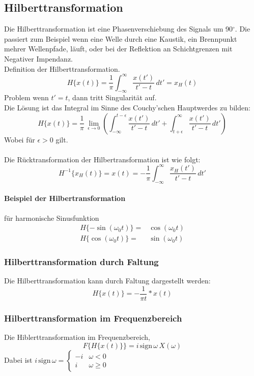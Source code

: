 \subsection{Hilberttransformation}
Die Hilberttransformation ist eine Phasenverschiebung des Signals um 90$^\circ$. Die passiert zum Beispiel wenn eine Welle durch eine Kaustik, ein Brennpunkt mehrer Wellenpfade, läuft, oder bei der Reflektion an Schichtgrenzen mit Negativer Impendanz.\\
Definition der Hilberttransformation.
\begin{equation}
H\{x(t)\} = \frac{1}{\pi} \int_{-\infty}^\infty \frac{x(t')}{t'-t}\,dt' = x_H(t)
\end{equation}
Problem wenn $t'=t$, dann tritt Singularität auf.\\
Die Lösung ist das Integral im Sinne des Couchy'schen Hauptwerdes zu bilden:
\begin{equation}
H\{x(t)\} = \frac{1}{\pi}\,\lim_{\epsilon \rightarrow 0} \left(\int_{-\infty}^{t-\epsilon} \frac{x(t')}{t'-t}\,dt' + \int_{t+\epsilon}^{\infty} \frac{x(t')}{t'-t}\,dt' \right)
\end{equation}
Wobei für $\epsilon > 0$ gilt.\\\\
Die Rücktransformation der Hilbertransformation ist wie folgt:
\begin{equation}
H^{-1}\{x_H(t)\} = x(t) = -\frac{1}{\pi} \int_{-\infty}^\infty \frac{x_H(t')}{t'-t}\,dt'
\end{equation}

\paragraph{Beispiel der Hilbertransformation} für harmonische Sinusfunktion
\[
\begin{split}
H\{-\sin (\omega_0t)\} = & \cos (\omega_0 t)\\
H\{\cos (\omega_0t)\} = & \sin (\omega_0 t)
\end{split}
\]

\subsubsection*{Hilberttransformation durch Faltung}
Die Hilberttransformation kann durch Faltung dargestellt werden:
\[
H\{x(t)\} = -\frac{1}{\pi t} * x(t)
\]

\subsubsection*{Hilberttransformation im Frequenzbereich}
Die Hiblerttransformation im Frequenzbereich,
\[
F\{H\{x(t)\}\} = i\,\mbox{sign}\,\omega\,X(\omega)
\]
Dabei ist $i\,\mbox{sign}\,\omega = 
\begin{cases}
-i & \omega < 0\\
i & \omega \geq 0
\end{cases}$

